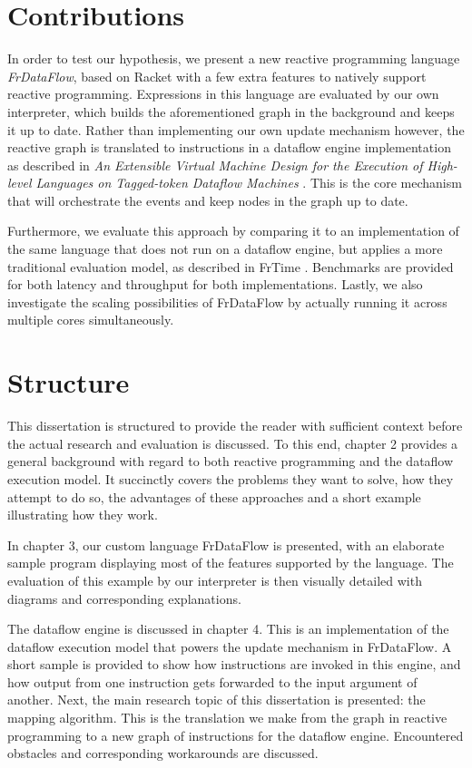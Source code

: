 \section{Contributions}

In order to test our hypothesis, we present a new reactive programming language \textit{FrDataFlow}, based on Racket with a few extra features to natively support reactive programming. Expressions in this language are evaluated by our own interpreter, which builds the aforementioned graph in the background and keeps it up to date. Rather than implementing our own update mechanism however, the reactive graph is translated to instructions in a dataflow engine implementation as described in \textit{An Extensible Virtual Machine Design for the Execution of High-level Languages on Tagged-token Dataflow Machines} \cite{saey_extensible_2017}. This is the core mechanism that will orchestrate the events and keep nodes in the graph up to date.

Furthermore, we evaluate this approach by comparing it to an implementation of the same language that does not run on a dataflow engine, but applies a more traditional evaluation model, as described in FrTime \cite{cooper_embedding_2006}. Benchmarks are provided for both latency and throughput for both implementations. Lastly, we also investigate the scaling possibilities of FrDataFlow by actually running it across multiple cores simultaneously. 

\section{Structure}

This dissertation is structured to provide the reader with sufficient context before the actual research and evaluation is discussed. To this end, chapter 2 provides a general background with regard to both reactive programming and the dataflow execution model. It succinctly covers the problems they want to solve, how they attempt to do so, the advantages of these approaches and a short example illustrating how they work.

In chapter 3, our custom language FrDataFlow is presented, with an elaborate sample program displaying most of the features supported by the language. The evaluation of this example by our interpreter is then visually detailed with diagrams and corresponding explanations. 

The dataflow engine is discussed in chapter 4. This is an implementation of the dataflow execution model that powers the update mechanism in FrDataFlow. A short sample is provided to show how instructions are invoked in this engine, and how output from one instruction gets forwarded to the input argument of another. Next, the main research topic of this dissertation is presented: the mapping algorithm. This is the translation we make from the graph in reactive programming to a new graph of instructions for the dataflow engine. Encountered obstacles and corresponding workarounds are discussed.

